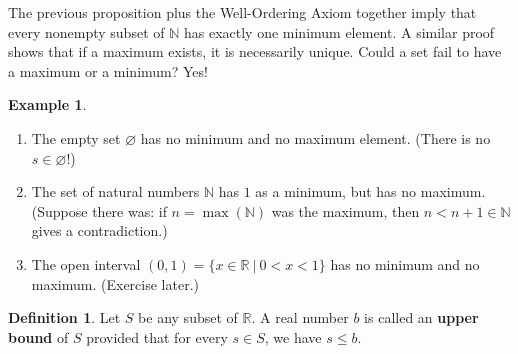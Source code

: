 \documentclass[12pt]{amsart}
\newcommand{\R}{{\mathbb{R}}}
\newcommand{\N}{\mathbb{N}}
\numberwithin{equation}{section}
\theoremstyle{plain} %
\theoremstyle{definition}
\newtheorem{defn}[equation]{Definition}
\newtheorem{ex}[equation]{Example}
\theoremstyle{remark}
\begin{document}
The previous proposition plus the Well-Ordering Axiom together imply that every nonempty subset of $\N$ has exactly one minimum element. A similar proof shows that if a maximum exists, it is necessarily unique. Could a set fail to have a maximum or a minimum? Yes!

\begin{ex}
\begin{enumerate}
\item The empty set $\varnothing$ has no minimum and no maximum element. (There is no $s\in \varnothing$!)
\item The set of natural numbers $\N$ has $1$ as a minimum, but has no maximum. (Suppose there was: if $n=\max(\N)$ was the maximum, then $n<n+1\in \N$ gives a contradiction.)
\item The open interval $(0,1)=\{ x\in \R \ | \ 0 < x < 1\}$ has no minimum and no maximum. (Exercise later.)
\end{enumerate}
\end{ex}




\begin{defn} Let $S$ be any subset of $\R$. A real number $b$ is called an  \textbf{upper bound} of $S$ provided that for every $s \in S$,
we have $s \leq b$. 
\end{defn}
\end{document}
